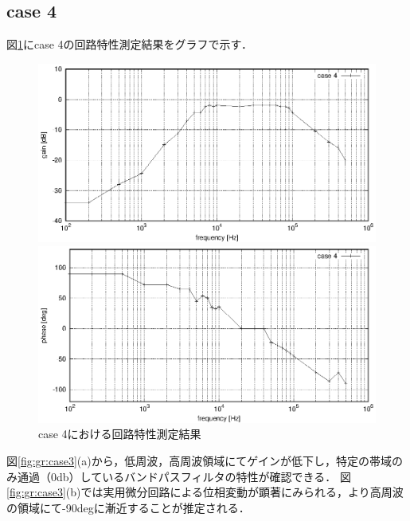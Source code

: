 \documentclass[dvipdfmx,titlepage,a4j]{jsarticle}  %
\begin{document}
\subsection{case 4}
図\ref{fig:gr:case4}にcase 4の回路特性測定結果をグラフで示す．
\begin{figure}[H]
  \centering
  \begin{minipage}{8cm}
    \centering
    \includegraphics[keepaspectratio, scale=0.6]{../data/case4-g.eps}
  \end{minipage}
  \begin{minipage}{8cm}
    \centering
    \includegraphics[keepaspectratio, scale=0.6]{../data/case4-f.eps}
  \end{minipage}
  \caption{case 4における回路特性測定結果}
  \label{fig:gr:case4}
\end{figure}

図\ref{fig:gr:case3}(a)から，低周波，高周波領域にてゲインが低下し，特定の帯域のみ通過（0db）しているバンドパスフィルタの特性が確認できる．
図\ref{fig:gr:case3}(b)では実用微分回路による位相変動が顕著にみられる，より高周波の領域にて-90degに漸近することが推定される．
\end{document}
